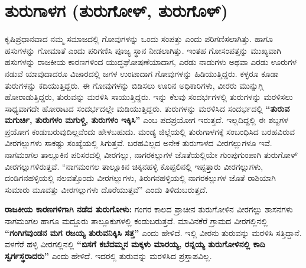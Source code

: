 \section{ತುರುಗಾಳಗ (ತುರುಗೋಳ್​, ತುರುಗೊಳ್​)}

ಕೃಷಿಪ್ರಧಾನವಾದ ನಮ್ಮ ಸಮಾಜದಲ್ಲಿ ಗೋವುಗಳನ್ನು ಒಂದು ಸಂಪತ್ತು ಎಂದು ಪರಿಗಣಿಸಲಾಗಿತ್ತು. ಹಾಗೂ ಹಸುಗಳನ್ನು ಗೋಮಾತೆ ಎಂದು ಪರಿಗಣಿಸಿ ಪೂಜ್ಯ ಸ್ಥಾನ ನೀಡಲಾಗಿತ್ತು. ಇಂತಹ ಗೋಸಂಪತ್ತನ್ನು ಮುಖ್ಯವಾಗಿ ಹಸುಗಳನ್ನು ರಾಜಕೀಯ ಕಾರಣಗಳಿಂದ ಯುದ್ಧಘೋಷಣೆಯಾದಾಗ, ಎರಡು ನಾಡುಗಳು ಅಥವಾ ಎರಡು ಊರುಗಳ ನಡುವೆ ಯಾವುದಾದರೂ ವಿಚಾರದಲ್ಲಿ ಜಗಳ ಉಂಟಾದಾಗ ಗೋವುಗಳನ್ನು ಹಿಡಿಯುತ್ತಿದ್ದರು. ಕಳ್ಳರೂ ಕೂಡಾ ತುರುಗಳನ್ನು ಕದಿಯುತ್ತಿದ್ದರು. ಈ ಗೋವುಗಳನ್ನು ಬಿಡಿಸಲು ಊರಿನ ಅಧಿಕಾರಿಗಳು, ವೀರರು ಮುನ್ನುಗ್ಗಿ ಹೋರಾಡುತ್ತಿದ್ದರು, ತುರುವನ್ನು ಮರಳಿಸಿ ಸಾಯುತ್ತಿದ್ದರು. ಇನ್ನು ಕೆಲವು ಸಂದರ್ಭಗಳಲ್ಲಿ ತುರುಗಳನ್ನು ಮರಳಿಸಲು ಸಾಧ್ಯವಾಗದೇ ಹೋರಾಟದ ಸಂದರ್ಭದಲ್ಲೇ ಮಡಿಯುತ್ತಿದ್ದರು. ತುರುಗಳನ್ನು ಮರಳಿಸಿದ ಸಂದರ್ಭದಲ್ಲಿ \textbf{“ತುರುವ ಮಗುರ್ಚಿ, ತುರುಗಳಂ ಮಗುಳ್ಚಿ, ತುರುಗಳಂ ಇಕ್ಕಿಸಿ”} ಎಂಬ ಪದಪ್ರಯೋಗ ಇರುತ್ತದೆ. ಇಲ್ಲದಿದ್ದಲ್ಲಿ ಈ ಶಬ್ದಗಳ ಪ್ರಯೋಗ ಕಂಡುಬರುವುದಿಲ್ಲವೆಂದು ಹೇಳಬಹುದು. ಮಂಡ್ಯ ಜಿಲ್ಲೆಯಲ್ಲಿ ತುರುಗಾಳಗಕ್ಕೆ ಸಂಬಂಧಿಸಿದ ಬರಹವಿರುವ ವೀರಗಲ್ಲುಗಳು ಸಾಕಷ್ಟು ಸಂಖ್ಯೆಯಲ್ಲಿ ಸಿಗುತ್ತವೆ. ಬರಹವಿಲ್ಲದ ಅನೇಕ ತುರುಗಾಳದ ವೀರಗಲ್ಲುಗಳೂ ಇವೆ. ನಾಗಮಂಗಲ ತಾಲ್ಲೂಕಿನ ಪರಿಸರದಲ್ಲಿ ವೀರಗಲ್ಲು, ನಾಗರಕಲ್ಲುಗಳ ಜೊತೆಯಲ್ಲಿಯೇ ಗುಂಪುಗುಂಪಾಗಿ ತುರುಗೋಳ್​ ವೀರಗಲ್ಲುಗಳಿರುತ್ತವೆ. “ನಾಗಮಂಗಲ ತಾಲ್ಲೂಕಿನ ಚಿಕ್ಕನಹಳ್ಳಿ ಕೊಪ್ಪಲಿನಲ್ಲಿ ಇಪ್ಪತ್ತಾರು ವೀರಗಲ್ಲುಗಳು, ದಂಡಿಗನಹಳ್ಳಿಯಲ್ಲಿ ನಲವತ್ತೊಂದು ವೀರಗಲ್ಲುಗಳು, ತಿರುಗನಹಳ್ಳಿಯಲ್ಲಿ ನಾಗರಕಲ್ಲುಗಳ ಜೊತೆ ರಾಶಿಯಾಗಿ ಸುಮಾರು ಮೂವತ್ತು ವೀರಗಲ್ಲುಗಳು ದೊರೆಯುತ್ತವೆ” ಎಂದು ತಿಳಿದುಬರುತ್ತದೆ.

\textbf{ರಾಜಕೀಯ ಕಾರಣಗಳಿಗಾಗಿ ನಡೆದ ತುರುಗೋಳು: } ಗಂಗರ ಕಾಲದ ಪ್ರಾಚೀನ ತುರುಗೋಳಿನ ವೀರಗಲ್ಲು ಶಾಸನಗಳು ನಾಗಮಂಗಲ ಹಾಗೂ ಮದ್ದೂರು ತಾಲ್ಲೂಕುಗಳಲ್ಲಿ ಕಂಡುಬರುತ್ತದೆ. ಮಾವಿನಕೆರೆ ಗ್ರಾಮದ ವೀರಗಲ್ಲಿನಲ್ಲಿ \textbf{“ಗಂಗಿಗವುಂಡನ ಮಗ ರಜಯ್ಯ ತುರುವನಿಕ್ಕಿಸಿ ಸತ್ತ”} ಎಂದು ಹೇಳಿದೆ. ಇಲ್ಲಿ ವೀರನು ತುರುವನ್ನು ಮರಳಿಸಿ ಸತ್ತಿದ್ದಾನೆ. ವಳಗೆರೆ ಹಳ್ಳಿ ವೀರಗಲ್ಲಿನಲ್ಲಿ \textbf{“ಬಿಸಗೆ ಕಬೆದಮ್ಮನ ಮಕ್ಕಳು ಮಾರಯ್ಯ, ರನ್ನಯ್ಯ ತುರುಗೋಳಿನಲ್ಲಿ ಕಾದಿ ಸ್ವರ್ಗಸ್ಥರಾದರು”} ಎಂದು ಹೇಳಿದೆ. ಇದರಲ್ಲಿ ತುರುವನ್ನು ಮರಳಿಸಿದ ಪ್ರಸ್ತಾಪವಿಲ್ಲ.

